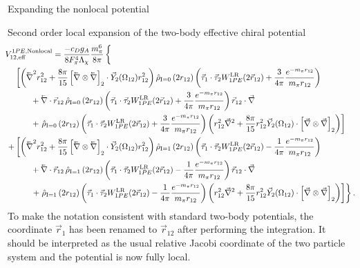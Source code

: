 \begin{section}{Expanding the nonlocal potential}
\begin{section}{Second order local expansion of the two-body effective chiral potential}
\begin{align}
&\hspace{-.4cm}V^{1PE,\text{Nonlocal}}_{12,\text{eff}}= \frac{-c_D g_A}{8F_\pi^4 \Lambda_\chi}\frac{m_\pi^6}{8\pi} \left\{\phantom{\frac{-c_D g_Am_\pi^6}{8 F_\pi^4 \Lambda_\chi}}\right.\\
&\left[\left(\lvec{\nabla}^2r_{12}^2+\frac{8\pi}{15}\left[\lvec{\nabla}\otimes \lvec{\nabla}\right]_2\cdot \vec{Y}_2(\Omega_{12})r_{12}^2 \right) \rhohat{0}{2 r_{12}}\left(\taudot W^{\text{LR}}_{1PE}(2\rot)+\frac{3}{4\pi}\yukawadimless{r_{12}} \right)\right. \\
%
&\hspace{.7cm}+\lvec{\nabla}\cdot\vec{r}_{12} \,\rhohat{0}{2 r_{12}} \left(\taudot W^{\text{LR}}_{1PE}(2\rot)+\frac{3}{4\pi}\yukawadimless{r_{12}} \right)\vec{r}_{12}\cdot\vec{\nabla} \\
%
&\hspace{.7cm}+\left.\rhohat{0}{2 r_{12}} \left(\taudot W^{\text{LR}}_{1PE}(2\rot)+\frac{3}{4\pi}\yukawadimless{r_{12}} \right)\left(r_{12}^2 \vec{\nabla}^2+\frac{8\pi}{15}r_{12}^2\vec{Y}_2(\Omega_{12})\cdot\left[\vec{\nabla}\otimes \vec{\nabla}\right]_2 \right)\right] \\
%
%
+&\left[\left(\lvec{\nabla}^2r_{12}^2+\frac{8\pi}{15}\left[\lvec{\nabla}\otimes \lvec{\nabla}\right]_2\cdot \vec{Y}_2(\Omega_{12})r_{12}^2 \right) \rhohat{1}{2 r_{12}} \left(\taudot W^{\text{LR}}_{1PE}(2\rot)-\frac{1}{4\pi}\yukawadimless{r_{12}} \right)\right. \\
%
&\hspace{.7cm}+\lvec{\nabla}\cdot\vec{r}_{12}\, \rhohat{1}{2 r_{12}} \left(\taudot W^{\text{LR}}_{1PE}(2\rot)-\frac{1}{4\pi}\yukawadimless{r_{12}} \right)\vec{r}_{12}\cdot\vec{\nabla} \\
%
&\left.\hspace{.7cm}+\left.\rhohat{1}{2 r_{12}}\left(\taudot W^{\text{LR}}_{1PE}(2\rot)-\frac{1}{4\pi}\yukawadimless{r_{12}} \right)\left(r_{12}^2 \vec{\nabla}^2+\frac{8\pi}{15}r_{12}^2\vec{Y}_2(\Omega_{12})\cdot\left[\vec{\nabla}\otimes \vec{\nabla}\right]_2 \right)\right]\right\}.
\end{align}
To make the notation consistent with standard two-body potentials, the coordinate $\vec{r}_1$ has been renamed to $\vec{r}_{12}$ after performing the integration. It should be interpreted as the usual relative Jacobi coordinate of the two particle system and the potential is now fully local.


\end{section}
\end{section}
